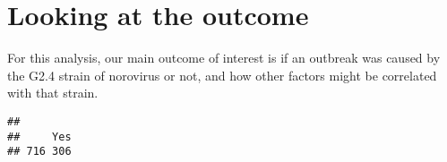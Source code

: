\documentclass[]{article}
\newenvironment{Shaded}{\begin{snugshade}}{\end{snugshade}}
\newcommand{\CommentTok}[1]{\textcolor[rgb]{0.56,0.35,0.01}{\textit{#1}}}
\newcommand{\KeywordTok}[1]{\textcolor[rgb]{0.13,0.29,0.53}{\textbf{#1}}}
\newcommand{\NormalTok}[1]{#1}
\newcommand{\OperatorTok}[1]{\textcolor[rgb]{0.81,0.36,0.00}{\textbf{#1}}}
\begin{document}
\hypertarget{looking-at-the-outcome}{%
\section{Looking at the outcome}\label{looking-at-the-outcome}}

For this analysis, our main outcome of interest is if an outbreak was
caused by the G2.4 strain of norovirus or not, and how other factors
might be correlated with that strain.

\begin{Shaded}
\end{Shaded}

\begin{verbatim}
## 
##     Yes 
## 716 306
\end{verbatim}

\begin{Shaded}
\end{Shaded}
\end{document}
